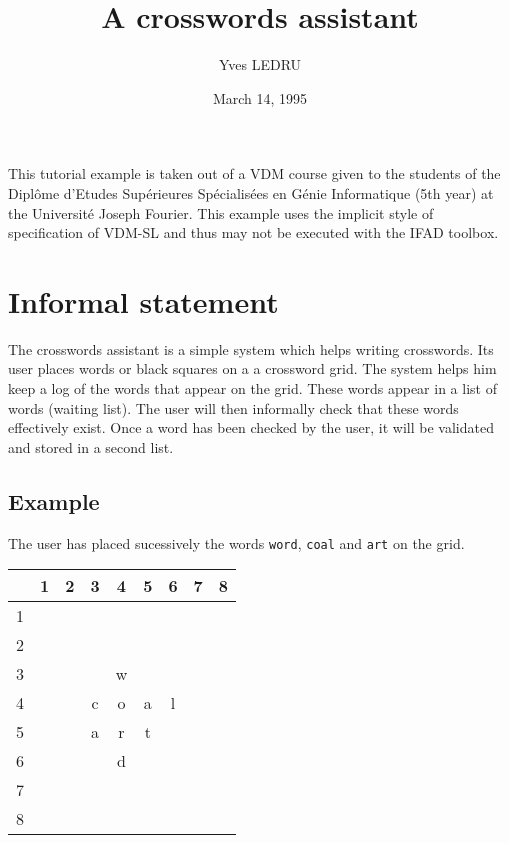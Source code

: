 \documentclass{article}
\title{A crosswords assistant}
\author{Yves LEDRU\footnotemark}
\date{March 14, 1995}
\begin{document}
\maketitle
{}


This tutorial example is taken out of a  VDM course given
to the students of the Dipl\^{o}me d'Etudes Sup\'erieures Sp\'ecialis\'ees en
G\'enie Informatique (5th year) at the Universit\'e Joseph Fourier.
This
example uses the implicit style of specification of VDM-SL and thus may not be
executed with the IFAD toolbox.


\section{Informal statement}

The crosswords assistant is a simple system which helps writing crosswords. 
Its user places words or black squares on a a crossword grid. 
The system  helps him keep a log of the words that appear on the grid.
These words  appear in a list of words (waiting list). 
The user will then informally check that these words effectively exist. Once a
word has been checked by the user, it will be validated and stored in a second
list. 

\subsection*{Example}

The user has placed sucessively the words {\tt word}, {\tt coal} and {\tt art}
on the grid. 

\vspace{0.5cm}

{\tt \begin{tabular}{r|c|c|c|c|c|c|c|c|}
 & 1 & 2 & 3 & 4 & 5 & 6 & 7 & 8\\
\hline
1 & & & & & & & & \\
\hline
2 & & & & & & & & \\
\hline
3 & & & &w& & & & \\
\hline
4 & & &c &o &a &l & & \\
\hline
5 & & &a &r&t & & & \\
\hline
6 & & & &d& & & & \\
\hline
7 & & & & & & & & \\
\hline
8 & & & & & & & & \\
\hline
\end{tabular}}
\end{document}
